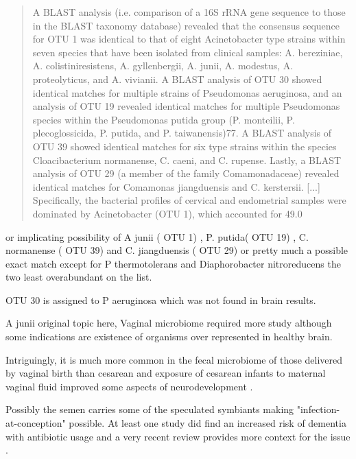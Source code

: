 \documentclass[aps,secnumarabic,balancelastpage,amsmath,amssymb,nofootinbib]{revtex4}
\begin{document}
\begin{quote}
A BLAST analysis (i.e. comparison of a 16S rRNA gene sequence to those in
the BLAST taxonomy database) revealed that the consensus sequence for OTU
1 was identical to that of eight Acinetobacter type strains within seven
species that have been isolated from clinical samples: A. bereziniae, A.
colistiniresistens, A. gyllenbergii, A. junii, A. modestus, A. proteolyticus,
and A. vivianii. A BLAST analysis of OTU 30 showed identical matches for
multiple strains of Pseudomonas aeruginosa, and an analysis of OTU 19 revealed
identical matches for multiple Pseudomonas species within the Pseudomonas
putida group (P. monteilii, P. plecoglossicida, P. putida, and P. taiwanensis)77.
A BLAST analysis of OTU 39 showed identical matches for six type strains
within the species Cloacibacterium normanense, C. caeni, and C. rupense.
Lastly, a BLAST analysis of OTU 29 (a member of the family Comamonadaceae)
revealed identical matches for Comamonas jiangduensis and C. kerstersii.
[...]
Specifically, the bacterial profiles of cervical and endometrial samples were dominated by Acinetobacter (OTU 1), which accounted for 49.0%

\end{quote}
\cite{Winters_Romero_Gervasi_Does_endometrial_cavity_2019}
or implicating possibility of A junii ( OTU 1) , P. putida( OTU 19) ,
C. normanense ( OTU 39) and C. jiangduensis ( OTU 29) or pretty
much a possible exact match except for P thermotolerans
and Diaphorobacter nitroreducens the two least overabundant on the list.  

OTU 30 is assigned to P aeruginosa which was not found in brain results. 


A junii original topic here, 
Vaginal microbiome required more study although some
indications are existence of organisms over represented
in healthy brain. 

Intriguingly, it is much more common in the fecal microbiome of
those delivered by vaginal
birth than cesarean \cite{Pandey2012}
and exposure of cesarean infants to maternal vaginal fluid
improved some aspects of neurodevelopment 
\cite{Zhou_Qiu_Wang_Effects_vaginal_microbiota_2023}.



Possibly the semen carries some of the speculated symbiants
\cite{Koort_Sosa_Turk_Lactobacillus_crispatus_2023}
\cite{10.3389/fcimb.2022.815786}
making "infection-at-conception" possible. 
At least one study did find an increased risk of dementia with
antibiotic usage
\cite{10.3389/fphar.2022.888333}
and a very recent review provides more context for the issue
\cite{KarenMOttemann_2023}.
\end{document}
